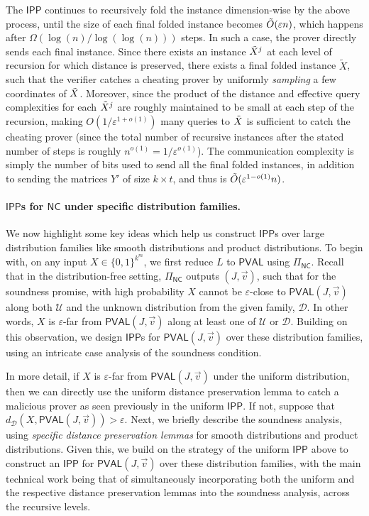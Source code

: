 \documentclass[10pt,a4paper]{article}
\newcommand{\NC}{\mathsf{NC}}
\newcommand{\PVAL}{\mathsf{PVAL}}
\newcommand{\IPP}{\mathsf{IPP}}
\newcommand{\sU}{\mathcal{U}}
\newcommand{\sD}{\mathcal{D}}
\begin{document}
The $\IPP$ continues to recursively fold the instance dimension-wise by the above process, until the size of each final folded instance becomes $\Tilde{O}(\varepsilon n)$, which happens after $\Omega(\log(n)/\log(\log(n)))$ steps. In such a case, the prover directly sends each final instance. Since there exists an instance $\Tilde{X}^j$ at each level of recursion for which distance is preserved, there exists a final folded instance $\tilde{X}$, such that the verifier catches a cheating prover by uniformly \textit{sampling} a few coordinates of $\Tilde{X}$. Moreover, since the product of the distance and effective query complexities for each $\Tilde{X}^j$ are roughly maintained to be small at each step of the recursion, making $O(1/\varepsilon^{1+o(1)})$ many queries to $\Tilde{X}$ is sufficient to catch the cheating prover (since the total number of recursive instances after the stated number of steps is roughly $n^{o(1)} = 1/\varepsilon^{o(1)}$). The communication complexity is simply the number of bits used to send all the final folded instances, in addition to sending the matrices $Y'$ of size $k \times t$, and thus is $\Tilde{O}(\varepsilon^{1-o(1)} n)$.

\paragraph*{$\IPP$s for $\NC$ under specific distribution families.}
 We now highlight some key ideas which help us construct $\IPP$s over large distribution families like smooth distributions and product distributions. To begin with, on any input $X \in \{0,1\}^{k^m}$, we first reduce $L$ to $\PVAL$ using $\Pi_\NC$. Recall that in the distribution-free setting, $\Pi_\NC$ outputs $(J,\vec{v})$, such that for the soundness promise, with high probability $X$ cannot be $\varepsilon$-close to $\PVAL(J,\Vec{v})$ along both $\sU$ and the unknown distribution from the given family, $\sD$. In other words, $X$ is $\varepsilon$-far from $\PVAL(J,\Vec{v})$ along at least one of $\sU$ or $\sD$. Building on this observation, we design $\IPP$s for $\PVAL(J,\Vec{v})$ over these distribution families, using an intricate case analysis of the soundness condition. 

In more detail, if $X$ is $\varepsilon$-far from $\PVAL(J,\vec{v})$ under the uniform distribution, then we can directly use the uniform distance preservation lemma to catch a malicious prover as seen previously in the uniform $\IPP$. If not, suppose that $d_\sD(X,\PVAL(J,\vec{v})) > \varepsilon$. Next, we briefly describe the soundness analysis, using \textit{specific distance preservation lemmas} for smooth distributions and product distributions. Given this, we build on the strategy of the uniform $\IPP$ above to construct an $\IPP$ for $\PVAL(J,\Vec{v})$ over these distribution families, with the main technical work being that of simultaneously incorporating both the uniform and the respective distance preservation lemmas into the soundness analysis, across the recursive levels.
\end{document}
